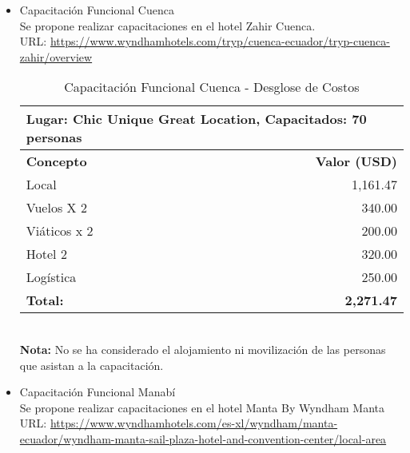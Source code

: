 \begin{itemize}
\begin{itemize}
\begin{table}[h]
                \label{tab:capacitacion-quito-funcional}
            \end{table}\\
        \item Capacitación Funcional Cuenca \\
            Se propone realizar capacitaciones en el hotel Zahir Cuenca.\\
            URL: \url{https://www.wyndhamhotels.com/tryp/cuenca-ecuador/tryp-cuenca-zahir/overview} \\
                \begin{table}[h]
                    \centering
                    \begin{tabular}{|l|r|}
                        \hline
                        \multicolumn{2}{|l|}{Lugar: Chic Unique Great Location, Capacitados: 70 personas} \\
                        \hline
                        \textbf{Concepto} & \textbf{Valor (USD)} \\
                        \hline
                        Local & 1,161.47 \\
                        \hline
                        Vuelos X 2 & 340.00 \\
                        \hline
                        Viáticos x 2 & 200.00 \\
                        \hline
                        Hotel 2 & 320.00 \\
                        \hline
                        Logística & 250.00 \\
                        \hline
                        \textbf{Total:} & \textbf{2,271.47} \\
                        \hline
                    \end{tabular}
                    \caption{Capacitación Funcional Cuenca - Desglose de Costos}
                    \label{tab:capacitacion-cuenca-funcional}
                \end{table} \\
        \textbf{Nota:} No se ha considerado el alojamiento ni movilización de las personas que asistan a la capacitación. \\
        \newpage
        \item Capacitación Funcional Manabí\\
        Se propone realizar capacitaciones en el hotel Manta By Wyndham Manta
        URL: \url{https://www.wyndhamhotels.com/es-xl/wyndham/manta-ecuador/wyndham-manta-sail-plaza-hotel-and-convention-center/local-area} \\

\end{itemize}
\end{itemize}
